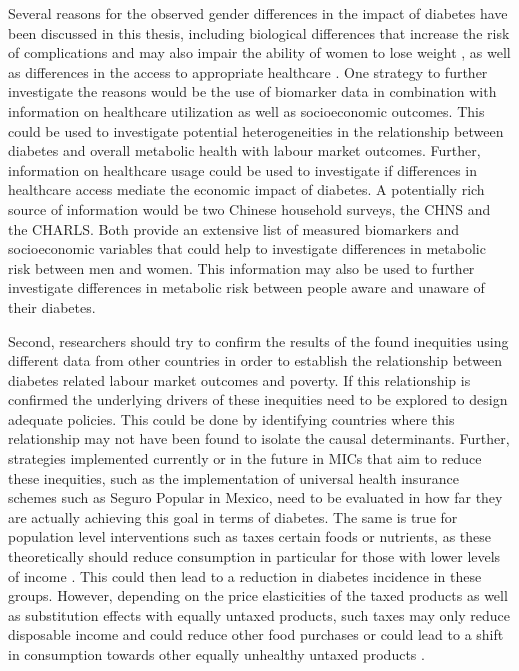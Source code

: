 Several reasons for the observed gender differences in the impact of diabetes have been discussed in this thesis, including biological differences that increase the risk of complications \textcite{Peters2014,Peters2015,Arnetz2014,Roche2013,Policardo2014,Catalan2015,Engelmann2016,Seghieri2015} and may also impair the ability of women to lose weight \parencite{Penno2013}, as well as differences in the access to appropriate healthcare \parencite{Penno2013}. One strategy to further investigate the reasons would be the use of biomarker data in combination with information on healthcare utilization as well as socioeconomic outcomes. This could be used to investigate potential heterogeneities in the relationship between diabetes and overall metabolic health with labour market outcomes. Further, information on healthcare usage could be used to investigate if differences in healthcare access mediate the economic impact of diabetes. A potentially rich source of information would be two Chinese household surveys, the \acf{CHNS} and the \acf{CHARLS}. Both provide an extensive list of measured biomarkers and socioeconomic variables that could help to investigate differences in metabolic risk between men and women. This information may also be used to further investigate differences in metabolic risk between people aware and unaware of their diabetes.

Second, researchers should try to confirm the results of the found inequities using different data from other countries in order to establish the relationship between diabetes related labour market outcomes and poverty. If this relationship is confirmed the underlying drivers of these inequities need to be explored to design adequate policies. This could be done by identifying countries where this relationship may not have been found to isolate the causal determinants. Further, strategies implemented currently or in the future in \acp{MIC} that aim to reduce these inequities, such as the implementation of universal health insurance schemes such as Seguro Popular in Mexico, need to be evaluated in how far they are actually achieving this goal in terms of diabetes. The same is true for population level interventions such as taxes certain foods or nutrients, as these theoretically should reduce consumption in particular for those with lower levels of income \parencite{Mytton2012c}. This could then lead to a reduction in diabetes incidence in these groups. However, depending on the price elasticities of the taxed products as well as substitution effects with equally untaxed products, such taxes may only reduce disposable income and could reduce other food purchases or could lead to a shift in consumption towards other equally unhealthy untaxed products \parencite{Mytton2012c}.


